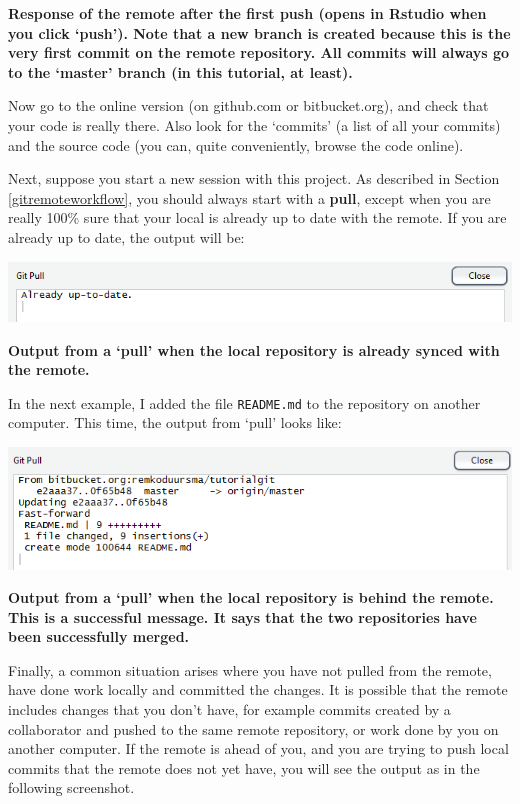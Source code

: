 \documentclass[]{book}
\begin{document}
\textbf{Response of the remote after the first push (opens in Rstudio when you click `push'). Note that a new branch is created because this is the very first commit on the remote repository. All commits will always go to the `master' branch (in this tutorial, at least).}

Now go to the online version (on github.com or bitbucket.org), and check that your code is really there. Also look for the `commits' (a list of all your commits) and the source code (you can, quite conveniently, browse the code online).

Next, suppose you start a new session with this project. As described in Section \ref{gitremoteworkflow}, you should always start with a \textbf{pull}, except when you are really 100\% sure that your local is already up to date with the remote. If you are already up to date, the output will be:

\includegraphics[width=0.75\linewidth]{screenshots/session2pullalreadyuptodate}

\textbf{Output from a `pull' when the local repository is already synced with the remote.}

In the next example, I added the file \texttt{README.md} to the repository on another computer. This time, the output from `pull' looks like:

\includegraphics[width=0.75\linewidth]{screenshots/session2pull}

\textbf{Output from a `pull' when the local repository is behind the remote. This is a successful message. It says that the two repositories have been successfully merged.}

Finally, a common situation arises where you have not pulled from the remote, have done work locally and committed the changes. It is possible that the remote includes changes that you don't have, for example commits created by a collaborator and pushed to the same remote repository, or work done by you on another computer. If the remote is ahead of you, and you are trying to push local commits that the remote does not yet have, you will see the output as in the following screenshot.
\end{document}
